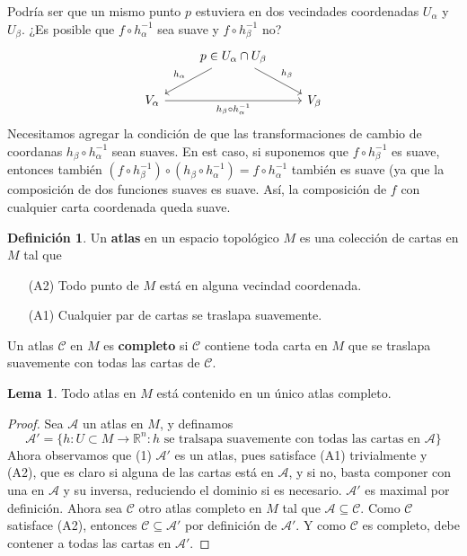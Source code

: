 \documentclass[spanish]{book}
\theoremstyle{definition}
\newtheorem*{defn}{Definición}
\newtheorem*{lema}{Lema}
\newcommand{\R}{\mathbb{R}}
\begin{document}
	Podría ser que un mismo punto $p$ estuviera en dos vecindades coordenadas $U_\alpha$ y $U_\beta$. ¿Es posible que $f\circ h^{-1}_\alpha$ sea suave y $f\circ h_\beta^{-1}$ no?
	\[\begin{tikzcd}
		&p\in U_\alpha\cap U_\beta\arrow{dl}[swap]{h_\alpha}\arrow{dr}{h_\beta}\\
		V_\alpha\arrow{rr}[swap]{h_\beta\circ h_\alpha^{-1}}&&V_\beta
	\end{tikzcd}\]
	Necesitamos agregar la condición de que las transformaciones de cambio de coordanas $h_\beta\circ h_\alpha^{-1}$ sean suaves. En est caso, si suponemos que $f\circ h_\beta^{-1}$ es suave, entonces también $(f\circ h_\beta^{-1})\circ(h_\beta\circ h_\alpha^{-1})=f\circ h_\alpha^{-1}$ también es suave (ya que la composición de dos funciones suaves es suave. Así, la composición de $f$ con cualquier carta coordenada queda suave.
	\begin{defn}
		Un \textbf{atlas} en un espacio topológico $M$ es una colección de cartas en $M$ tal que
		\begin{enumerate}
			\item[(A2)] Todo punto de $M$ está en alguna vecindad coordenada.
			\item[(A1)] Cualquier par de cartas se traslapa suavemente.
		\end{enumerate}
		Un atlas $\mathcal C$ en $M$ es \textbf{completo} si $\mathcal{C}$ contiene toda carta en $M$ que se traslapa suavemente con todas las cartas de $\mathcal{C}$.
	\end{defn}
	\begin{lema}
		Todo atlas en $M$ está contenido en un único atlas completo.
	\end{lema}
	\begin{proof}
		Sea $\mathcal{A}$ un atlas en $M$, y definamos
		\[\mathcal{A}'=\{h:U\subset M\to\R^n:h\text{ se tralsapa suavemente con todas las cartas en }\mathcal{A}\}\]
		Ahora observamos que (1) $\mathcal{A}'$ es un atlas, pues satisface (A1) trivialmente y (A2), que es claro si alguna de las cartas está en $\mathcal{A}$, y si no, basta componer con una en $\mathcal{A}$ y su inversa, reduciendo el dominio si es necesario. $\mathcal{A}'$ es maximal por definición. Ahora sea $\mathcal{C}$ otro atlas completo en $M$ tal que $\mathcal{A}\subseteq\mathcal{C}$. Como $\mathcal{C}$ satisface (A2), entonces $\mathcal{C}\subseteq\mathcal{A}'$ por definición de $\mathcal{A}'$. Y como $\mathcal{C}$ es completo, debe contener a todas las cartas en $\mathcal{A}'$.
		
	\end{proof}
\end{document}
